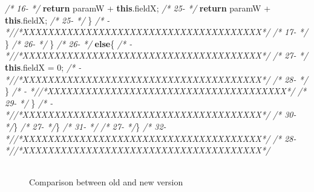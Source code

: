 \documentclass[
]{article}
\newenvironment{Shaded}{\begin{snugshade}}{\end{snugshade}}
\newcommand{\CommentTok}[1]{\textcolor[rgb]{0.56,0.35,0.01}{\textit{#1}}}
\newcommand{\DecValTok}[1]{\textcolor[rgb]{0.00,0.00,0.81}{#1}}
\newcommand{\FunctionTok}[1]{\textcolor[rgb]{0.00,0.00,0.00}{#1}}
\newcommand{\KeywordTok}[1]{\textcolor[rgb]{0.13,0.29,0.53}{\textbf{#1}}}
\newcommand{\NormalTok}[1]{#1}
\begin{document}
\begin{landscape}
\begin{Shaded}
\begin{Highlighting}[]
\CommentTok{/* 16-                 */}        \KeywordTok{return}\NormalTok{ paramW + }\KeywordTok{this}\NormalTok{.}\FunctionTok{fieldX}\NormalTok{;                           }\CommentTok{/* 25-                 */}        \KeywordTok{return}\NormalTok{ paramW + }\KeywordTok{this}\NormalTok{.}\FunctionTok{fieldX}\NormalTok{;                           }
\CommentTok{/* 25-                 */}\NormalTok{        \}                                                                }\CommentTok{/*   -                 *//*XXXXXXXXXXXXXXXXXXXXXXXXXXXXXXXXXXXXXX*/}                     
\CommentTok{/* 17-                 */}\NormalTok{     \}                                                         }\CommentTok{/* 26-                 */}\NormalTok{     \}                                                         }
\CommentTok{/* 26-                 */}        \KeywordTok{else}\NormalTok{\{                                                  }\CommentTok{/*   -                 *//*XXXXXXXXXXXXXXXXXXXXXXXXXXXXXXXXXXXXXX*/}                     
\CommentTok{/* 27-                 */}            \KeywordTok{this}\NormalTok{.}\FunctionTok{fieldX}\NormalTok{ = }\DecValTok{0}\NormalTok{;                                   }\CommentTok{/*   -                 *//*XXXXXXXXXXXXXXXXXXXXXXXXXXXXXXXXXXXXXX*/}                     
\CommentTok{/* 28-                 */}\NormalTok{        \}                                                      }\CommentTok{/*   -                 *//*XXXXXXXXXXXXXXXXXXXXXXXXXXXXXXXXXXXXXX*/}                     
\CommentTok{/* 29-                 */}\NormalTok{    \}                                                          }\CommentTok{/*   -                 *//*XXXXXXXXXXXXXXXXXXXXXXXXXXXXXXXXXXXXXX*/}                     
\CommentTok{/* 30-                 */}\NormalTok{\}                                                              }\CommentTok{/* 27-                 */}\NormalTok{\}                                                              }
\CommentTok{/* 31-                 */}                                                               \CommentTok{/* 27-                 */}\NormalTok{\}                                                              }
\CommentTok{/* 32-                 *//*XXXXXXXXXXXXXXXXXXXXXXXXXXXXXXXXXXXXXX*/}                     \CommentTok{/* 28-                 *//*XXXXXXXXXXXXXXXXXXXXXXXXXXXXXXXXXXXXXX*/}                     
\end{Highlighting}
\end{Shaded}

\normalsize

\begin{figure}
\centering
\includegraphics{figures/fake.png}
\caption{Comparison between old and new version
\label{comparison_changing_method_order_2}}
\end{figure}

\end{landscape}
\end{document}
